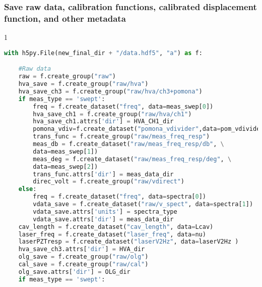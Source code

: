 \subsubsection{Save raw data, calibration functions, calibrated
displacement function, and other
metadata}\label{save-raw-data-calibration-functions-calibrated-displacement-function-and-other-metadata}

\begin{spacing}{1} \begin{lstlisting}[frame=single, language=Python]
with h5py.File(new_final_dir + "/data.hdf5", "a") as f:                      # Store raw / calibrated data along with metadata in data directory

    #Raw data
    raw = f.create_group("raw")
    hva_save = f.create_group("raw/hva")                                     # where hva data will be saved
    hva_save_ch3 = f.create_group("raw/hva/ch3+pomona")
    if meas_type == 'swept':
        freq = f.create_dataset("freq", data=meas_swep[0])                   # common frequency vector
        hva_save_ch1 = f.create_group("raw/hva/ch1")
        hva_save_ch1.attrs['dir'] = HVA_CH1_dir
        pomona_vdiv=f.create_dataset("pomona_vdivider",data=pom_vdivider)    # Voltage divider factor
        trans_func = f.create_group("raw/meas_freq_resp")
        meas_db = f.create_dataset("raw/meas_freq_resp/db", \
        data=meas_swep[1])
        meas_deg = f.create_dataset("raw/meas_freq_resp/deg", \
        data=meas_swep[2])
        trans_func.attrs['dir'] = meas_data_dir
        direc_volt = f.create_group("raw/vdirect")                           # the Vpk voltage and phase information of the signal directly sent to the electrodes
    else:
        freq = f.create_dataset("freq", data=spectra[0])                     # common frequency vector
        vdata_save = f.create_dataset("raw/v_spect", data=spectra[1])
        vdata_save.attrs['units'] = spectra_type
        vdata_save.attrs['dir'] = meas_data_dir                              # where error signal spectra will be saved
    cav_length = f.create_dataset("cav_length", data=Lcav)
    laser_freq = f.create_dataset("laser_freq", data=nu)
    laserPZTresp = f.create_dataset("laserV2Hz", data=laserV2Hz )
    hva_save_ch3.attrs['dir'] = HVA_dir
    olg_save = f.create_group("raw/olg")                                     # where olg data will be saved
    cal_save = f.create_group("raw/cal")                                     # easily accessible loop calibration factor data
    olg_save.attrs['dir'] = OLG_dir
    if meas_type == 'swept':

\end{lstlisting}
\end{spacing}
